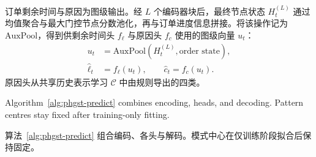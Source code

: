 \documentclass[a4paper,fleqn]{cas-dc}
\newcommand{\zhpara}[1]{%
  \par\begingroup\small\color{black!72}\noindent #1\par\endgroup}
\begin{document}
\zhpara{订单剩余时间与原因为图级输出。经 $L$ 个编码器块后，最终节点状态 $H_t^{(L)}$ 通过均值聚合与最大门控节点分数池化，再与订单进度信息拼接。将该操作记为 $\mathrm{AuxPool}$，得到供剩余时间头 $f_\ell$ 与原因头 $f_c$ 使用的图级向量 $u_t$：
\begin{equation}
\begin{aligned}
u_t&=\mathrm{AuxPool}(H_t^{(L)},\text{order state}),\\
\hat\ell_t&=f_\ell(u_t),\qquad \hat c_t=f_c(u_t).
\end{aligned}
\end{equation}
原因头从共享历史表示学习 $\mathcal{C}$ 中由规则导出的四类。}


Algorithm~\ref{alg:phgst-predict} combines encoding, heads, and decoding. Pattern centres stay fixed after training-only fitting.

\zhpara{算法~\ref{alg:phgst-predict} 组合编码、各头与解码。模式中心在仅训练阶段拟合后保持固定。}
\end{document}
